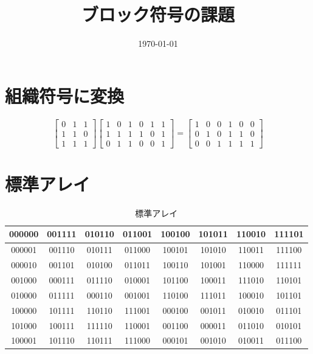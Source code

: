 \documentclass[a4paper,11pt]{jsarticle}
\begin{document}
\title{ブロック符号の課題}
\author{}
\date{\today}
\maketitle

\section{組織符号に変換}
\begin{equation*}
  \begin{bmatrix}
    0 & 1 & 1 \\
    1 & 1 & 0 \\
    1 & 1 & 1
  \end{bmatrix}
  \begin{bmatrix}
    1 & 0 & 1 & 0 & 1 & 1 \\
    1 & 1 & 1 & 1 & 0 & 1 \\
    0 & 1 & 1 & 0 & 0 & 1
  \end{bmatrix}=
  \begin{bmatrix}
    1 & 0 & 0 & 1 & 0 & 0 \\
    0 & 1 & 0 & 1 & 1 & 0 \\
    0 & 0 & 1 & 1 & 1 & 1
  \end{bmatrix}
\end{equation*}

\section{標準アレイ}
\begin{table}[hbtp]
  \caption{標準アレイ}
  \label{table:std-array}
  \centering
  \begin{tabular}{c|ccccccc}
    000000 & 001111 &	010110 & 011001	& 100100 & 101011 &	110010 & 111101 \\
    \hline
    000001 & 001110 &	010111 & 011000 &	100101 & 101010	& 110011 & 111100 \\
    000010 & 001101	& 010100 & 011011	& 100110 & 101001 & 110000 & 111111 \\
    001000 & 000111	& 011110 & 010001	& 101100 & 100011	& 111010 & 110101 \\
    010000 & 011111	& 000110 & 001001	& 110100 & 111011 & 100010 & 101101 \\
    100000 & 101111	& 110110 & 111001	& 000100 & 001011	& 010010 & 011101 \\
    101000 & 100111 & 111110 & 110001 & 001100 & 000011 & 011010 & 010101 \\
    100001 & 101110	& 110111 & 111000	& 000101 & 001010	& 010011 & 011100
  \end{tabular}
\end{table}
\end{document}
